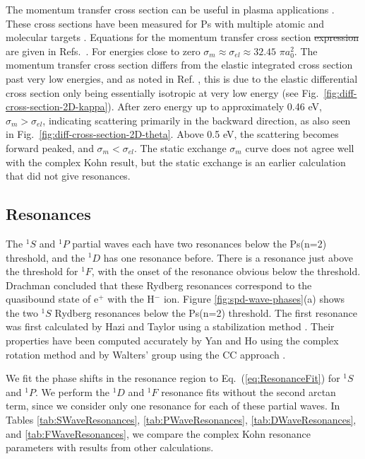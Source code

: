 \documentclass[preprint,showpacs,showkeys,preprintnumbers,amsmath,amssymb,longbibliography,pra,aps]{revtex4-1}
\begin{document}
{The momentum transfer cross section can be useful in plasma applications
\cite{Wang2014, McEachran2014}. These cross sections have been measured for Ps
with multiple atomic and molecular targets \cite{Nagashima1998,Saito2003}. 
Equations for the momentum transfer cross section \sout{expression} are given
in Refs.~\cite{Bransden2003,Massey1969}.
For energies close to zero
$\sigma_m \approx \sigma_{el} \approx 32.45$ $\pi a_0^2$.
The momentum transfer cross section differs from the elastic integrated cross
section past very low energies, and as 
noted in Ref. \cite{Blackwood2002c}, this is due to the elastic differential
cross section only being essentially isotropic at very low energy
(see Fig.~\ref{fig:diff-cross-section-2D-kappa}).
After zero energy up to approximately 0.46 eV, $\sigma_m > \sigma_{el}$,
indicating scattering primarily in the backward direction, as also seen in
Fig.~\ref{fig:diff-cross-section-2D-theta}. Above 0.5 eV, the scattering
becomes forward peaked, and $\sigma_m < \sigma_{el}$. The static
exchange $\sigma_m$ curve \cite{Hara1975} does not agree well with the
complex Kohn result, but the static exchange is an earlier calculation 
that did not give resonances.


\subsection{Resonances}
\label{sec:Resonances}

The $^1S$ and $^1P$ partial waves each have two resonances below the Ps(n=2) 
threshold, and the $^1D$ has one resonance before. There is a resonance just 
above the threshold for $^1F$, with the onset of the resonance obvious below the 
threshold. Drachman \cite{Drachman1979} concluded that these Rydberg 
resonances correspond to the quasibound state of e$^+$ with the H$^-$ ion.
Figure \ref{fig:spd-wave-phases}(a) shows the 
two $^1S$ Rydberg resonances below the Ps(n=2) threshold. The first resonance 
 was first 
calculated by Hazi and Taylor using a stabilization method \cite{Hazi1970}. 
Their properties have been computed accurately by Yan and Ho using the complex 
rotation method \cite{Yan1999} and by Walters' group using the CC 
approach \cite{Walters2004}.

We fit the phase shifts in the resonance region to Eq.~(\ref{eq:ResonanceFit})
for $^1S$ and $^1P$. We perform the $^1D$ and $^1F$ resonance fits without 
the second arctan term, since we consider only
one resonance for each of these partial waves. In 
Tables \ref{tab:SWaveResonances}, \ref{tab:PWaveResonances},
\ref{tab:DWaveResonances}, and \ref{tab:FWaveResonances}, we compare the
complex Kohn resonance parameters with results from other calculations.

}
\end{document}
